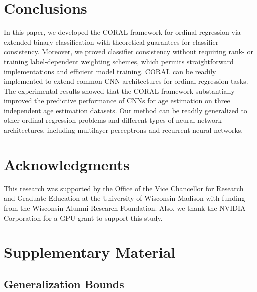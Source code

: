 \documentclass[times,twocolumn,final,authoryear]{elsarticle}
\begin{document}
\section{Conclusions}
\label{sec:conclusions}

In this paper, we developed the CORAL framework for ordinal regression via extended binary classification with theoretical guarantees for classifier consistency. Moreover, we proved classifier consistency without requiring rank- or training label-dependent weighting schemes, which permits straightforward implementations and efficient model training. 
CORAL can be readily implemented to extend common CNN architectures for ordinal regression tasks. The experimental results showed that the CORAL framework substantially improved the predictive performance of CNNs for age estimation on three independent age estimation datasets. Our method can be readily generalized to other ordinal regression problems and different types of neural network architectures, including multilayer perceptrons and recurrent neural networks.


\section{Acknowledgments}

This research was supported by the Office of the Vice Chancellor for Research and Graduate Education at the University of Wisconsin-Madison with funding from the Wisconsin Alumni Research Foundation. Also, we thank the NVIDIA Corporation for a GPU grant to support this study.



\FloatBarrier
\clearpage




\FloatBarrier
\clearpage

\section{Supplementary Material}


\subsection{Generalization Bounds}
\end{document}

